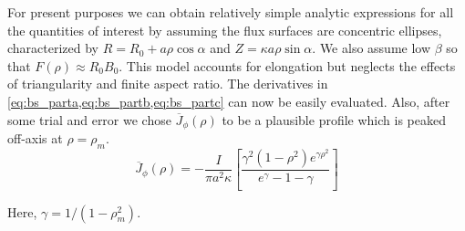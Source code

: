 For present purposes we can obtain relatively simple analytic expressions for all the quantities of interest by assuming the flux surfaces are concentric ellipses, characterized by $R = R _ { 0 } + a \rho \cos \alpha$ and $Z = \kappa a \rho \sin \alpha$. We also assume low $\beta$ so that $F ( \rho ) \approx R _ { 0 } B _ { 0 }$. This model accounts for elongation but neglects the effects of triangularity and finite aspect ratio. The derivatives in \cref{eq:bs_parta,eq:bs_partb,eq:bs_partc} can now be easily evaluated. Also, after some trial and error we chose $\overline { J } _ { \phi } ( \rho )$ to be a plausible profile which is peaked off-axis at $\rho = \rho_m$.
\begin{equation}
	\overline { J } _ { \phi } ( \rho ) = - \frac { I } { \pi a ^ { 2 } \kappa } \left[ \frac { \gamma ^ { 2 } \left( 1 - \rho ^ { 2 } \right) e ^ { \gamma \rho ^ { 2 } } } { e ^ { \gamma } - 1 - \gamma } \right]
\end{equation}

Here, $\gamma = 1 / ( 1 - \rho_m^2 )$.

 \pagebreak


